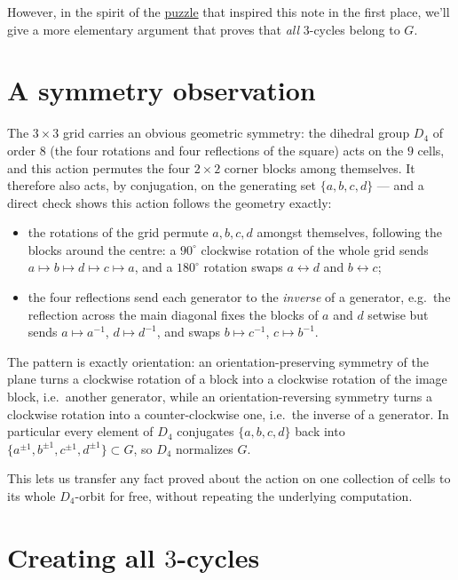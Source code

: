\documentclass[11pt]{article}
\begin{document}
However, in the spirit of the \href{https://michael-albert-dun.github.io/tintangle}{puzzle} that inspired this note in the first place, we'll give a more elementary argument that proves that \emph{all} $3$-cycles belong to $G$.

\section{A symmetry observation}\label{sec:symmetry}

The $3\times3$ grid carries an obvious geometric symmetry: the dihedral group $D_4$ of order $8$ (the four rotations and four reflections of the square) acts on the $9$ cells, and this action permutes the four $2\times2$ corner blocks among themselves. It therefore also acts, by conjugation, on the generating set $\{a,b,c,d\}$ — and a direct check shows this action follows the geometry exactly:

\begin{itemize}
\item the rotations of the grid permute $a,b,c,d$ amongst themselves, following the blocks around the centre: a $90^\circ$ clockwise rotation of the whole grid sends $a\mapsto b\mapsto d\mapsto c\mapsto a$, and a $180^\circ$ rotation swaps $a\leftrightarrow d$ and $b\leftrightarrow c$;
\item the four reflections send each generator to the \emph{inverse} of a generator, e.g.\ the reflection across the main diagonal fixes the blocks of $a$ and $d$ setwise but sends $a\mapsto a^{-1}$, $d\mapsto d^{-1}$, and swaps $b\mapsto c^{-1}$, $c\mapsto b^{-1}$.
\end{itemize}

The pattern is exactly orientation: an orientation-preserving symmetry of the plane turns a clockwise rotation of a block into a clockwise rotation of the image block, i.e.\ another generator, while an orientation-reversing symmetry turns a clockwise rotation into a counter-clockwise one, i.e.\ the inverse of a generator. In particular every element of $D_4$ conjugates $\{a,b,c,d\}$ back into $\{a^{\pm1},b^{\pm1},c^{\pm1},d^{\pm1}\} \subset G$, so $D_4$ normalizes $G$.

This lets us transfer any fact proved about the action on one collection of cells to its whole $D_4$-orbit for free, without repeating the underlying computation. 

\section{Creating all $3$-cycles}
\end{document}
